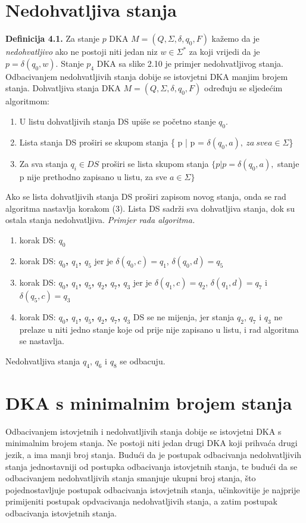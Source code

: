 \documentclass[titlepage]{article}
\begin{document}
\section{Nedohvatljiva stanja}
\textbf{Definicija 4.1.} Za stanje $p$ DKA $M = (Q, \Sigma, \delta, q_0, F)$ kažemo da je \textit{nedohvatljivo} ako ne postoji niti jedan niz $w \in \Sigma^*$ za koji vrijedi da je $p = \delta(q_0,w)$. Stanje $p_4$ DKA sa slike 2.10 je primjer nedohvatljivog stanja. Odbacivanjem nedohvatljivih stanja dobije se istovjetni DKA  manjim brojem stanja. Dohvatljiva stanja DKA $M = (Q, \Sigma, \delta, q_0, F)$ određuju se sljedećim algoritmom: 
\begin{enumerate}
\item U listu dohvatljivih stanja DS upiše se početno stanje $q_0$.
\item Lista stanja DS proširi se skupom stanja \{ p | p = $\delta(q_0, a),\ za\ sve a \in \Sigma$\}
\item Za sva stanja $q_i \in DS$ proširi se lista skupom stanja $\{ p | p = \delta(q_0, a),$ stanje p nije prethodno zapisano u listu, za sve $a \in \Sigma\}$
\end{enumerate}
Ako se lista dohvatljivih stanja DS proširi zapisom novog stanja, onda se rad algoritma nastavlja korakom (3). Lista DS sadrži sva dohvatljiva stanja, dok su ostala stanja nedohvatljiva. 
\newline
\textit{Primjer rada algoritma.}
\begin{enumerate}
\item korak DS: \textbf{$q_0  $}
\item korak DS: \textbf{$q_0$, $q_1$, $q_5  $} 
\newline jer je $\delta(q_0,c) = q_1$, $\delta(q_0,d) = q_5$
\item korak DS: \textbf{$q_0$, $q_1$, $q_5$, $q_2$, $q_7$, $q_3$} 
\newline jer je $\delta(q_1,c) = q_2$, $\delta(q_1,d) = q_7$ i $\delta(q_5,c) = q_3$
\item korak DS: \textbf{$q_0$, $q_1$, $q_5$, $q_2$, $q_7$, $q_3 $} 
\newline DS se ne mijenja, jer stanja $q_2$, $q_7$ i $q_3$ ne prelaze u niti jedno stanje koje od prije nije zapisano u listu, i rad algoritma se nastavlja. 
\end{enumerate}
Nedohvatljiva stanja $q_4$, $q_6$ i $q_8$ se odbacuju.  
\newpage
\section{DKA s minimalnim brojem stanja}
Odbacivanjem istovjetnih i nedohvatljivih stanja dobije se istovjetni DKA s minimalnim brojem stanja. Ne postoji niti jedan drugi DKA koji prihvaća drugi jezik, a ima manji broj stanja. Budući da je postupak odbacivanja nedohvatljivih stanja jednostavniji od postupka odbacivanja istovjetnih stanja, te budući da se odbacivanjem nedohvatljivih stanja smanjuje ukupni broj stanja, što pojednostavljuje postupak odbacivanja istovjetnih stanja, učinkovitije je najprije primijeniti postupak opdvacivanja nedohvatljivih stanja, a zatim postupak odbacivanja istovjetnih stanja. 
\end{document}
